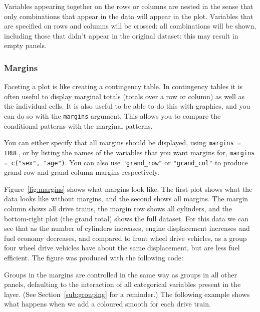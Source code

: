 Variables appearing together on the rows or columns are nested in the sense that only combinations that appear in the data will appear in the plot.  Variables that are specified on rows and columns will be crossed: all combinations will be shown, including those that didn't appear in the original dataset: this may result in empty panels.

\subsubsection{Margins}\label{sub:margins}

Faceting a plot is like creating a contingency table.  In contingency tables it is often useful to display marginal totals (totals over a row or column) as well as the individual cells.  It is also useful to be able to do this with graphics, and you can do so with the {\tt margins} argument.  This allows you to compare the conditional patterns with the marginal patterns.

You can either specify that all margins should be displayed, using {\tt margins = TRUE}, or by listing the names of the variables that you want margins for, {\tt margins = c("sex", "age")}.  You can also use \verb|"grand_row"| or \verb|"grand_col"| to produce grand row and grand column margins respectively.  

Figure~\ref{fig:margins} shows what margins look like.  The first plot shows what the data looks like without margins, and the second shows all margins.  The margin column shows all drive trains, the margin row shows all cylinders, and the bottom-right plot (the grand total) shows the full dataset.  For this data we can see that as the number of cylinders increases, engine displacement increases and fuel economy decreases, and compared to front wheel drive vehicles, as a group four wheel drive vehicles have about the same displacement, but are less fuel efficient.  The figure was produced with the following code:

% 


Groups in the margins are controlled in the same way as groups in all other panels, defaulting to the interaction of all categorical variables present in the layer.  (See Section~\ref{sub:grouping} for a reminder.)  The following example shows what happens when we add a coloured smooth for each drive train. 

